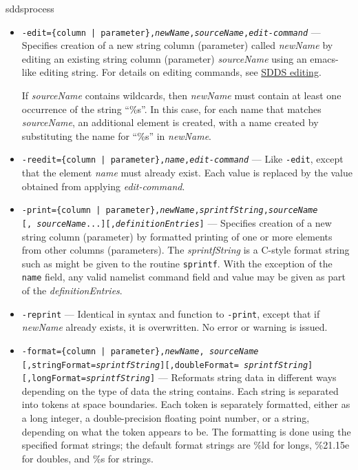 \begin{sddsprog}{sddsprocess}
\begin{itemize}
\begin{itemize}
         \item {\tt -edit=\{column | parameter\},{\em newName},{\em sourceName},{\em edit-command}} --- Specifies
creation of a new string column (parameter) called {\em newName} by editing an existing string column (parameter) {\em
sourceName} using an emacs-like editing string.  For details on editing commands, see \hyperref[SDDSediting]{SDDS editing}.
         
        If {\em sourceName} contains wildcards, then {\em newName} must contain at least one occurrence of the string
``\%s''.  In this case, for each name that matches {\em sourceName}, an additional element is created, with a
name created by substituting the name for ``\%s'' in {\em newName}.

         \item {\tt -reedit=\{column | parameter\},{\em name},{\em edit-command}} --- Like {\tt -edit},
except that the element {\em name} must already exist.  Each value is replaced by the value obtained from
applying {\em edit-command}.
         
        \item {\tt -print=\{column | parameter\},{\em newName},{\em sprintfString},{\em sourceName}}\\ {\tt [,{\em
sourceName}...][,{\em definitionEntries}]} --- Specifies creation of a new string column (parameter) by formatted
printing of one or more elements from other columns (parameters).  The {\em sprintfString} is a C-style format string
such as might be given to the routine {\tt sprintf}.  With the exception of the {\tt name} field, any valid namelist
command field and value may be given as part of the {\em definitionEntries}.

        \item {\tt -reprint} --- Identical in syntax and function to {\tt -print}, except that if {\em newName} 
already exists, it is overwritten.  No error or warning is issued.

        \item {\tt -format=\{column | parameter\},{\em newName},{\em
sourceName}} \\ {\tt [,stringFormat={\em sprintfString}][,doubleFormat={\em
sprintfString}]} \\ {\tt [,longFormat={\em sprintfString}]} --- Reformats string
data in different ways depending on the type of data the string
contains.  Each string is separated into tokens at space boundaries.
Each token is separately formatted, either as a long integer, a
double-precision floating point number, or a string, depending on what
the token appears to be.  The formatting is done using the specified
format strings; the default format strings are \%ld for longs,
\%21.15e for doubles, and \%s for strings.


\end{itemize}
\end{itemize}
\end{sddsprog}
